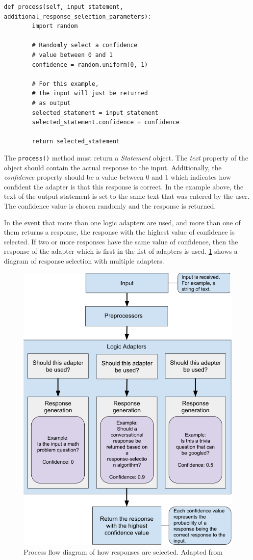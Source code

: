 \documentclass[12pt,a4paper]{article}
\newcommand{\captionstyle}[1] {
    \small{#1}
}
\begin{document}
\begin{lstlisting}[caption={\captionstyle{Example implementation of the process() method. Adapted from \cite{Chatterbot:online}}}, label={lst:process}]
    def process(self, input_statement, additional_response_selection_parameters):
        import random

        # Randomly select a confidence
        # value between 0 and 1
        confidence = random.uniform(0, 1)

        # For this example,
        # the input will just be returned
        # as output
        selected_statement = input_statement
        selected_statement.confidence = confidence

        return selected_statement
\end{lstlisting}

The \texttt{process()} method must return a \textit{Statement} object. The \textit{text} property of the object should contain the actual response to the input. Additionally, the \textit{confidence} property should be a value between 0 and 1 which indicates how confident the adapter is that this response is correct. In the example above, the text of the output statement is set to the same text that was entered by the user. The confidence value is chosen randomly and the response is returned.

In the event that more than one logic adapters are used, and more than one of them returns a response, the response with the highest value of confidence is selected. If two or more responses have the same value of confidence, then the response of the adapter which is first in the list of adapters is used. \cref{fig:dialog-processing-flow} shows a diagram of response selection with multiple adapters.

\begin{figure}[!htb]%
    \centering
    \includegraphics[width=0.7\columnwidth]{dialog-processing-flow}%
    \caption{\captionstyle{Process flow diagram of how responses are selected. Adapted from \cite{Chatterbot:online}}}%
    \label{fig:dialog-processing-flow}%
\end{figure}
\end{document}
